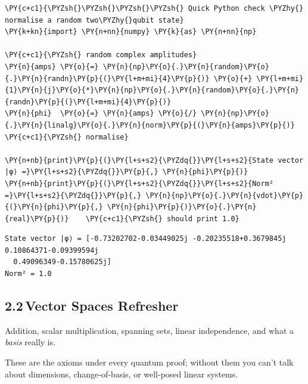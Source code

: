     \begin{tcolorbox}[breakable, size=fbox, boxrule=1pt, pad at break*=1mm,colback=cellbackground, colframe=cellborder]
\begin{Verbatim}[commandchars=\\\{\}]
\PY{c+c1}{\PYZsh{}\PYZsh{}\PYZsh{}\PYZsh{} Quick Python check \PYZhy{} normalise a random two\PYZhy{}qubit state}
\PY{k+kn}{import} \PY{n+nn}{numpy} \PY{k}{as} \PY{n+nn}{np}

\PY{c+c1}{\PYZsh{} random complex amplitudes}
\PY{n}{amps} \PY{o}{=} \PY{n}{np}\PY{o}{.}\PY{n}{random}\PY{o}{.}\PY{n}{randn}\PY{p}{(}\PY{l+m+mi}{4}\PY{p}{)} \PY{o}{+} \PY{l+m+mi}{1}\PY{n}{j}\PY{o}{*}\PY{n}{np}\PY{o}{.}\PY{n}{random}\PY{o}{.}\PY{n}{randn}\PY{p}{(}\PY{l+m+mi}{4}\PY{p}{)}
\PY{n}{phi}  \PY{o}{=} \PY{n}{amps} \PY{o}{/} \PY{n}{np}\PY{o}{.}\PY{n}{linalg}\PY{o}{.}\PY{n}{norm}\PY{p}{(}\PY{n}{amps}\PY{p}{)}          \PY{c+c1}{\PYZsh{} normalise}

\PY{n+nb}{print}\PY{p}{(}\PY{l+s+s2}{\PYZdq{}}\PY{l+s+s2}{State vector |φ⟩ =}\PY{l+s+s2}{\PYZdq{}}\PY{p}{,} \PY{n}{phi}\PY{p}{)}
\PY{n+nb}{print}\PY{p}{(}\PY{l+s+s2}{\PYZdq{}}\PY{l+s+s2}{Norm² =}\PY{l+s+s2}{\PYZdq{}}\PY{p}{,} \PY{n}{np}\PY{o}{.}\PY{n}{vdot}\PY{p}{(}\PY{n}{phi}\PY{p}{,} \PY{n}{phi}\PY{p}{)}\PY{o}{.}\PY{n}{real}\PY{p}{)}    \PY{c+c1}{\PYZsh{} should print 1.0}
\end{Verbatim}
\end{tcolorbox}

    \begin{Verbatim}[commandchars=\\\{\}]
State vector |φ⟩ = [-0.73202702-0.03449025j -0.20235518+0.3679845j
0.10864371-0.09399594j
  0.49096349-0.15780625j]
Norm² = 1.0
    \end{Verbatim}

    \hypertarget{vector-spaces-refresher}{%
\subsection*{2.2\,Vector Spaces
Refresher}\label{vector-spaces-refresher}}

Addition, scalar multiplication, spanning sets, linear independence, and
what a \emph{basis} really is.

These are the axioms under every quantum proof; without them you can't
talk about dimensions, change‑of‑basis, or well‑posed linear systems.

